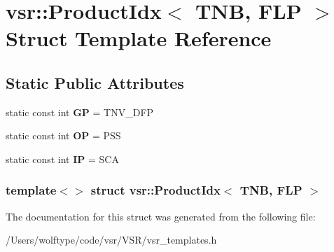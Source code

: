 \hypertarget{structvsr_1_1_product_idx_3_01_t_n_b_00_01_f_l_p_01_4}{\section{vsr\-:\-:Product\-Idx$<$ T\-N\-B, F\-L\-P $>$ Struct Template Reference}
\label{structvsr_1_1_product_idx_3_01_t_n_b_00_01_f_l_p_01_4}
}
\subsection*{Static Public Attributes}
\begin{DoxyCompactItemize}
\item 
\hypertarget{structvsr_1_1_product_idx_3_01_t_n_b_00_01_f_l_p_01_4_a3e222a4bbb7538473caf22ec96cb2df9}{static const int {\bfseries G\-P} = T\-N\-V\-\_\-\-D\-F\-P}\label{structvsr_1_1_product_idx_3_01_t_n_b_00_01_f_l_p_01_4_a3e222a4bbb7538473caf22ec96cb2df9}

\item 
\hypertarget{structvsr_1_1_product_idx_3_01_t_n_b_00_01_f_l_p_01_4_a46b17b56cd1cdc9af8bdc55a2f3bb0d9}{static const int {\bfseries O\-P} = P\-S\-S}\label{structvsr_1_1_product_idx_3_01_t_n_b_00_01_f_l_p_01_4_a46b17b56cd1cdc9af8bdc55a2f3bb0d9}

\item 
\hypertarget{structvsr_1_1_product_idx_3_01_t_n_b_00_01_f_l_p_01_4_a6743567651958792d1fce1adc9bffd83}{static const int {\bfseries I\-P} = S\-C\-A}\label{structvsr_1_1_product_idx_3_01_t_n_b_00_01_f_l_p_01_4_a6743567651958792d1fce1adc9bffd83}

\end{DoxyCompactItemize}
\subsubsection*{template$<$$>$ struct vsr\-::\-Product\-Idx$<$ T\-N\-B, F\-L\-P $>$}



The documentation for this struct was generated from the following file\-:\begin{DoxyCompactItemize}
\item 
/\-Users/wolftype/code/vsr/\-V\-S\-R/vsr\-\_\-templates.\-h\end{DoxyCompactItemize}
